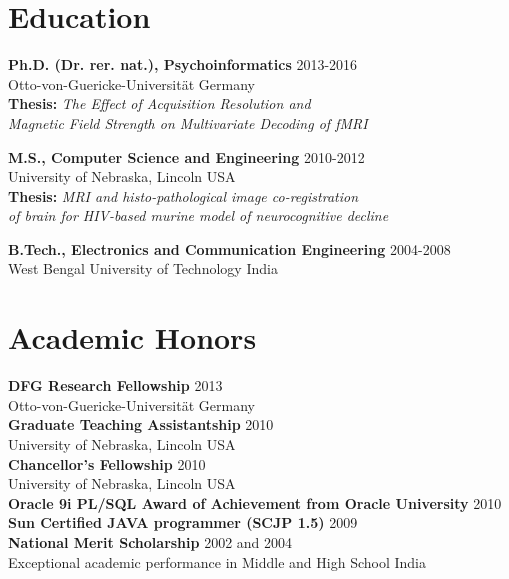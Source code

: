 \documentclass[line, margin]{res}
\begin{document}
\begin{resume}
\section{Education}

\textbf{Ph.D. (Dr. rer. nat.), Psychoinformatics} \hfill 2013-2016\\ 
Otto-von-Guericke-Universit\"{a}t \hfill Germany\\
\small\textbf{Thesis:} \textit{The Effect of Acquisition Resolution and\\
Magnetic Field Strength on Multivariate Decoding of fMRI}

\textbf{M.S., Computer Science and Engineering} \hfill 2010-2012\\
University of Nebraska, Lincoln \hfill USA\\
\small\textbf{Thesis:} \textit{MRI and histo-pathological image co-registration\\ 
of brain for HIV-based murine model of neurocognitive decline}

\textbf{B.Tech., Electronics and Communication Engineering} \hfill 2004-2008\\
West Bengal University of Technology \hfill India\\



\section{Academic Honors}
\textbf{DFG Research Fellowship} \hfill 2013\\
Otto-von-Guericke-Universit\"{a}t \hfill Germany\\

\textbf{Graduate Teaching Assistantship} \hfill 2010\\
University of Nebraska, Lincoln \hfill USA\\

\textbf{Chancellor's Fellowship} \hfill 2010\\
University of Nebraska, Lincoln \hfill USA\\

\textbf{Oracle 9i PL/SQL Award of Achievement from Oracle University} \hfill 2010\\

\textbf{Sun Certified JAVA programmer (SCJP 1.5)} \hfill 2009\\

\textbf{National Merit Scholarship} \hfill 2002 and 2004\\
Exceptional academic performance in Middle and High School \hfill India\\




\end{resume}
\end{document}
